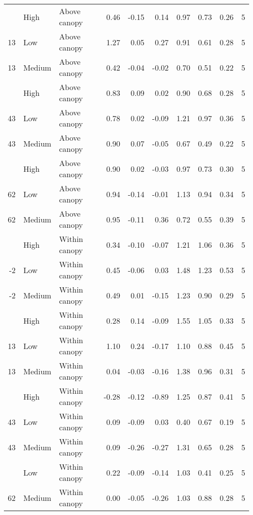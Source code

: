 \documentclass[10pt,]{article}
\begin{document}
\begin{longtable}{rllrrrrrrr}
\addlinespace
13 & High & Above canopy & 0.46 & -0.15 & 0.14 & 0.97 & 0.73 & 0.26 & 5\\
13 & Low & Above canopy & 1.27 & 0.05 & 0.27 & 0.91 & 0.61 & 0.28 & 5\\
13 & Medium & Above canopy & 0.42 & -0.04 & -0.02 & 0.70 & 0.51 & 0.22 & 5\\
\addlinespace
43 & High & Above canopy & 0.83 & 0.09 & 0.02 & 0.90 & 0.68 & 0.28 & 5\\
43 & Low & Above canopy & 0.78 & 0.02 & -0.09 & 1.21 & 0.97 & 0.36 & 5\\
43 & Medium & Above canopy & 0.90 & 0.07 & -0.05 & 0.67 & 0.49 & 0.22 & 5\\
\addlinespace
62 & High & Above canopy & 0.90 & 0.02 & -0.03 & 0.97 & 0.73 & 0.30 & 5\\
62 & Low & Above canopy & 0.94 & -0.14 & -0.01 & 1.13 & 0.94 & 0.34 & 5\\
62 & Medium & Above canopy & 0.95 & -0.11 & 0.36 & 0.72 & 0.55 & 0.39 & 5\\
\addlinespace
-2 & High & Within canopy & 0.34 & -0.10 & -0.07 & 1.21 & 1.06 & 0.36 & 5\\
-2 & Low & Within canopy & 0.45 & -0.06 & 0.03 & 1.48 & 1.23 & 0.53 & 5\\
-2 & Medium & Within canopy & 0.49 & 0.01 & -0.15 & 1.23 & 0.90 & 0.29 & 5\\
\addlinespace
13 & High & Within canopy & 0.28 & 0.14 & -0.09 & 1.55 & 1.05 & 0.33 & 5\\
13 & Low & Within canopy & 1.10 & 0.24 & -0.17 & 1.10 & 0.88 & 0.45 & 5\\
13 & Medium & Within canopy & 0.04 & -0.03 & -0.16 & 1.38 & 0.96 & 0.31 & 5\\
\addlinespace
43 & High & Within canopy & -0.28 & -0.12 & -0.89 & 1.25 & 0.87 & 0.41 & 5\\
43 & Low & Within canopy & 0.09 & -0.09 & 0.03 & 0.40 & 0.67 & 0.19 & 5\\
43 & Medium & Within canopy & 0.09 & -0.26 & -0.27 & 1.31 & 0.65 & 0.28 & 5\\
\addlinespace
62 & Low & Within canopy & 0.22 & -0.09 & -0.14 & 1.03 & 0.41 & 0.25 & 5\\
62 & Medium & Within canopy & 0.00 & -0.05 & -0.26 & 1.03 & 0.88 & 0.28 & 5\\*
\end{longtable}\endgroup{}

\clearpage
\begingroup\fontsize{7}{9}\selectfont
\end{document}
